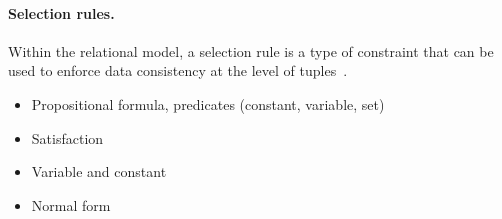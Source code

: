 \paragraph{Selection rules.}
Within the relational model, a selection rule is a type of constraint that can be used to enforce data consistency at the level of tuples~\cite{Boeckling2022}.

\begin{itemize}
    \item Propositional formula, predicates (constant, variable, set)
    \item Satisfaction
    \item Variable and constant
    \item Normal form
\end{itemize}
